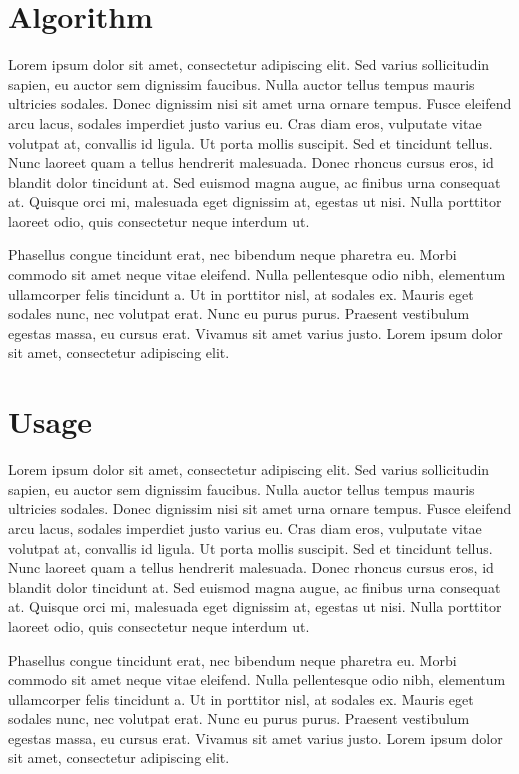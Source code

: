 \documentclass[article]{jss}
\begin{document}
\section{Algorithm}\label{algorithm}

Lorem ipsum dolor sit amet, consectetur adipiscing elit. Sed varius
sollicitudin sapien, eu auctor sem dignissim faucibus. Nulla auctor
tellus tempus mauris ultricies sodales. Donec dignissim nisi sit amet
urna ornare tempus. Fusce eleifend arcu lacus, sodales imperdiet justo
varius eu. Cras diam eros, vulputate vitae volutpat at, convallis id
ligula. Ut porta mollis suscipit. Sed et tincidunt tellus. Nunc laoreet
quam a tellus hendrerit malesuada. Donec rhoncus cursus eros, id blandit
dolor tincidunt at. Sed euismod magna augue, ac finibus urna consequat
at. Quisque orci mi, malesuada eget dignissim at, egestas ut nisi. Nulla
porttitor laoreet odio, quis consectetur neque interdum ut.

Phasellus congue tincidunt erat, nec bibendum neque pharetra eu. Morbi
commodo sit amet neque vitae eleifend. Nulla pellentesque odio nibh,
elementum ullamcorper felis tincidunt a. Ut in porttitor nisl, at
sodales ex. Mauris eget sodales nunc, nec volutpat erat. Nunc eu purus
purus. Praesent vestibulum egestas massa, eu cursus erat. Vivamus sit
amet varius justo. Lorem ipsum dolor sit amet, consectetur adipiscing
elit.

\section{Usage}\label{usage}

Lorem ipsum dolor sit amet, consectetur adipiscing elit. Sed varius
sollicitudin sapien, eu auctor sem dignissim faucibus. Nulla auctor
tellus tempus mauris ultricies sodales. Donec dignissim nisi sit amet
urna ornare tempus. Fusce eleifend arcu lacus, sodales imperdiet justo
varius eu. Cras diam eros, vulputate vitae volutpat at, convallis id
ligula. Ut porta mollis suscipit. Sed et tincidunt tellus. Nunc laoreet
quam a tellus hendrerit malesuada. Donec rhoncus cursus eros, id blandit
dolor tincidunt at. Sed euismod magna augue, ac finibus urna consequat
at. Quisque orci mi, malesuada eget dignissim at, egestas ut nisi. Nulla
porttitor laoreet odio, quis consectetur neque interdum ut.

Phasellus congue tincidunt erat, nec bibendum neque pharetra eu. Morbi
commodo sit amet neque vitae eleifend. Nulla pellentesque odio nibh,
elementum ullamcorper felis tincidunt a. Ut in porttitor nisl, at
sodales ex. Mauris eget sodales nunc, nec volutpat erat. Nunc eu purus
purus. Praesent vestibulum egestas massa, eu cursus erat. Vivamus sit
amet varius justo. Lorem ipsum dolor sit amet, consectetur adipiscing
elit.
\end{document}
